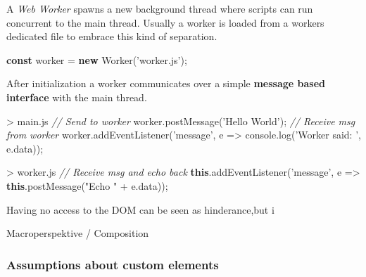 \documentclass[]{assets/latex/ieee}
\newenvironment{Shaded}{}{}
\newcommand{\KeywordTok}[1]{\textcolor[rgb]{0.00,0.44,0.13}{\textbf{{#1}}}}
\newcommand{\StringTok}[1]{\textcolor[rgb]{0.25,0.44,0.63}{{#1}}}
\newcommand{\CommentTok}[1]{\textcolor[rgb]{0.38,0.63,0.69}{\textit{{#1}}}}
\newcommand{\VariableTok}[1]{\textcolor[rgb]{0.10,0.09,0.49}{{#1}}}
\newcommand{\OperatorTok}[1]{\textcolor[rgb]{0.40,0.40,0.40}{{#1}}}
\newcommand{\AttributeTok}[1]{\textcolor[rgb]{0.49,0.56,0.16}{{#1}}}
\newcommand{\NormalTok}[1]{{#1}}
\begin{document}
A \emph{Web Worker} spawns a new background thread where scripts can run
concurrent to the main thread. Usually a worker is loaded from a workers
dedicated file to embrace this kind of separation.

\begin{Shaded}
\begin{Highlighting}[]
\KeywordTok{const} \NormalTok{worker }\OperatorTok{=} \KeywordTok{new} \AttributeTok{Worker}\NormalTok{(}\StringTok{'worker.js'}\NormalTok{)}\OperatorTok{;}
\end{Highlighting}
\end{Shaded}

After initialization a worker communicates over a simple \textbf{message
based interface} with the main thread.

\begin{Shaded}
\begin{Highlighting}[]
\OperatorTok{>} \VariableTok{main}\NormalTok{.}\AttributeTok{js}
\CommentTok{// Send to worker}
\VariableTok{worker}\NormalTok{.}\AttributeTok{postMessage}\NormalTok{(}\StringTok{'Hello World'}\NormalTok{)}\OperatorTok{;}
\CommentTok{// Receive msg from worker}
\VariableTok{worker}\NormalTok{.}\AttributeTok{addEventListener}\NormalTok{(}\StringTok{'message'}\OperatorTok{,} \NormalTok{e }\OperatorTok{=>}
  \VariableTok{console}\NormalTok{.}\AttributeTok{log}\NormalTok{(}\StringTok{'Worker said: '}\OperatorTok{,} \VariableTok{e}\NormalTok{.}\AttributeTok{data}\NormalTok{))}\OperatorTok{;}
\end{Highlighting}
\end{Shaded}

\begin{Shaded}
\begin{Highlighting}[]
\OperatorTok{>} \VariableTok{worker}\NormalTok{.}\AttributeTok{js}
\CommentTok{// Receive msg and echo back}
\KeywordTok{this}\NormalTok{.}\AttributeTok{addEventListener}\NormalTok{(}\StringTok{'message'}\OperatorTok{,} \NormalTok{e }\OperatorTok{=>}
  \KeywordTok{this}\NormalTok{.}\AttributeTok{postMessage}\NormalTok{(}\StringTok{"Echo "} \OperatorTok{+} \VariableTok{e}\NormalTok{.}\AttributeTok{data}\NormalTok{))}\OperatorTok{;}
\end{Highlighting}
\end{Shaded}

Having no access to the DOM can be seen as hinderance,but i

Macroperspektive / Composition

\subsubsection{Assumptions about custom
elements}\label{assumptions-about-custom-elements}
\end{document}
